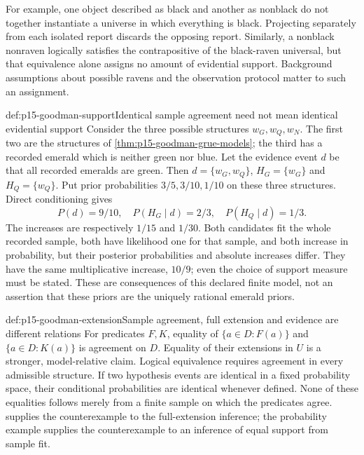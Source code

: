 For example, one object described as black and another as nonblack do not
together instantiate a universe in which everything is black. Projecting
separately from each isolated report discards the opposing report.
Similarly, a nonblack nonraven logically satisfies the contrapositive
of the black-raven universal, but that equivalence alone assigns no
amount of evidential support. Background assumptions about possible
ravens and the observation protocol matter to such an assignment.

\begin{hbexample}{def:p15-goodman-support}{Identical sample agreement need not mean identical evidential support}
Consider the three possible structures $w_G,w_Q,w_N$. The first two are
the structures of \cref{thm:p15-goodman-grue-models}; the third has a
recorded emerald which is neither green nor blue. Let the evidence event
$d$ be that all recorded emeralds are green. Then
$d=\{w_G,w_Q\}$, $H_G=\{w_G\}$ and $H_Q=\{w_Q\}$.
Put prior probabilities $3/5,3/10,1/10$ on these three structures.
Direct conditioning gives
\[
 P(d)=9/10,\quad P(H_G\mid d)=2/3,\quad P(H_Q\mid d)=1/3.
\]
The increases are respectively $1/15$ and $1/30$. Both candidates fit
the whole recorded sample, both have likelihood one for that sample,
and both increase in probability, but their posterior probabilities
and absolute increases differ. They have the same multiplicative
increase, $10/9$; even the choice of support measure must be stated.
These are consequences of this declared finite model, not an assertion
that these priors are the uniquely rational emerald priors.
\end{hbexample}

\begin{hbwarning}{def:p15-goodman-extension}{Sample agreement, full extension and evidence are different relations}
For predicates $F,K$, equality of
$\{a\in D:F(a)\}$ and $\{a\in D:K(a)\}$ is agreement on $D$.
Equality of their extensions in $U$ is a stronger, model-relative claim.
Logical equivalence requires agreement in every admissible structure.
If two hypothesis events are identical in a fixed probability space,
their conditional probabilities are identical whenever defined. None
of these equalities follows merely from a finite sample on which the
predicates agree.  supplies the counterexample
to the full-extension inference; the probability example supplies the
counterexample to an inference of equal support from sample fit.
\end{hbwarning}

